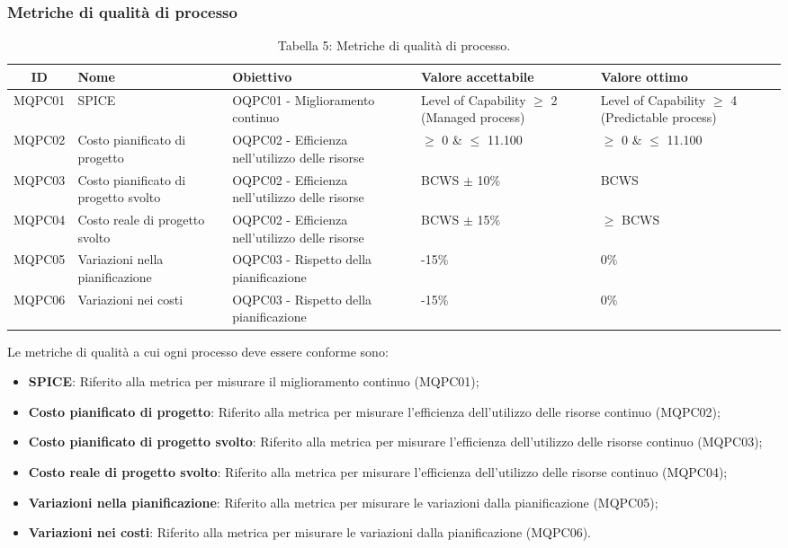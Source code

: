 \subsubsection{Metriche di qualità di processo}
\begin{table}[H]
	\centering
	\begin{tabularx}{\textwidth}{|c|X|X|X|X|}
		\hline
		\textbf{ID} & \textbf{Nome} & \textbf{Obiettivo} & \textbf{Valore accettabile} & \textbf{Valore ottimo}\\
		\hline
		MQPC01 & SPICE & OQPC01 - Miglioramento continuo & Level of Capability $\geq$ 2 (Managed process) & Level of Capability $\geq$ 4 (Predictable process) \\
		\hline
		MQPC02 & Costo pianificato di progetto & OQPC02 - Efficienza nell'utilizzo delle risorse & $\geq$ 0 \& $\le$ 11.100 & $\geq$ 0 \& $\le$ 11.100\\
		\hline
		MQPC03 & Costo pianificato di progetto svolto & OQPC02 - Efficienza nell'utilizzo delle risorse & BCWS $ \pm $ 10\% & BCWS \\
		\hline
		MQPC04 & Costo reale di progetto svolto & OQPC02 - Efficienza nell'utilizzo delle risorse & BCWS $ \pm $ 15\% & $\geq$ BCWS \\
		\hline
		MQPC05 & Variazioni nella pianificazione & OQPC03 - Rispetto della pianificazione & -15\% & 0\% \\
		\hline
		MQPC06 & Variazioni nei costi & OQPC03 - Rispetto della pianificazione & -15\% & 0\% \\
		\hline
	\end{tabularx}
	\caption{Tabella 5: Metriche di qualità di processo.}
\end{table}
Le metriche di qualità a cui ogni processo deve essere conforme sono:
\begin{itemize}
	\item \textbf{SPICE}: Riferito alla metrica per misurare il miglioramento continuo (MQPC01);
	\item \textbf{Costo pianificato di progetto}: Riferito alla metrica per misurare l'efficienza dell'utilizzo delle risorse continuo (MQPC02);
	\item \textbf{Costo pianificato di progetto svolto}: Riferito alla metrica per misurare l'efficienza dell'utilizzo delle risorse continuo (MQPC03);
	\item \textbf{Costo reale di progetto svolto}: Riferito alla metrica per misurare l'efficienza dell'utilizzo delle risorse continuo (MQPC04);
	\item \textbf{Variazioni nella pianificazione}: Riferito alla metrica per misurare le variazioni dalla pianificazione (MQPC05);
	\item \textbf{Variazioni nei costi}: Riferito alla metrica per misurare le variazioni dalla pianificazione (MQPC06).
\end{itemize}
